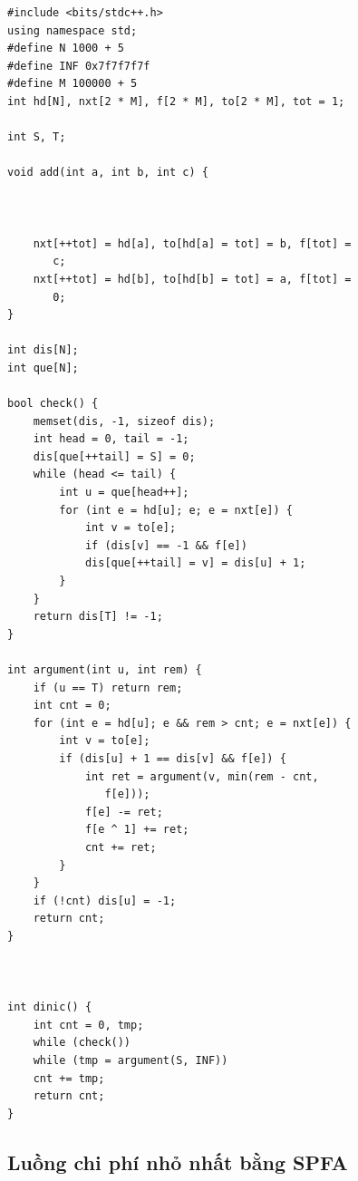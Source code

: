 \documentclass[11pt]{article}
\begin{document}
\begingroup
\footnotesize
\begin{verbatim}
#include <bits/stdc++.h>
using namespace std;
#define N 1000 + 5
#define INF 0x7f7f7f7f
#define M 100000 + 5
int hd[N], nxt[2 * M], f[2 * M], to[2 * M], tot = 1;

int S, T;

void add(int a, int b, int c) {



    nxt[++tot] = hd[a], to[hd[a] = tot] = b, f[tot] =
       c;
    nxt[++tot] = hd[b], to[hd[b] = tot] = a, f[tot] =
       0;
}

int dis[N];
int que[N];

bool check() {
    memset(dis, -1, sizeof dis);
    int head = 0, tail = -1;
    dis[que[++tail] = S] = 0;
    while (head <= tail) {
        int u = que[head++];
        for (int e = hd[u]; e; e = nxt[e]) {
            int v = to[e];
            if (dis[v] == -1 && f[e])
            dis[que[++tail] = v] = dis[u] + 1;
        }
    }
    return dis[T] != -1;
}

int argument(int u, int rem) {
    if (u == T) return rem;
    int cnt = 0;
    for (int e = hd[u]; e && rem > cnt; e = nxt[e]) {
        int v = to[e];
        if (dis[u] + 1 == dis[v] && f[e]) {
            int ret = argument(v, min(rem - cnt,
               f[e]));
            f[e] -= ret;
            f[e ^ 1] += ret;
            cnt += ret;
        }
    }
    if (!cnt) dis[u] = -1;
    return cnt;
}



int dinic() {
    int cnt = 0, tmp;
    while (check())
    while (tmp = argument(S, INF))
    cnt += tmp;
    return cnt;
}
\end{verbatim}
\endgroup

\subsection{Luồng chi phí nhỏ nhất bằng SPFA}
\end{document}
